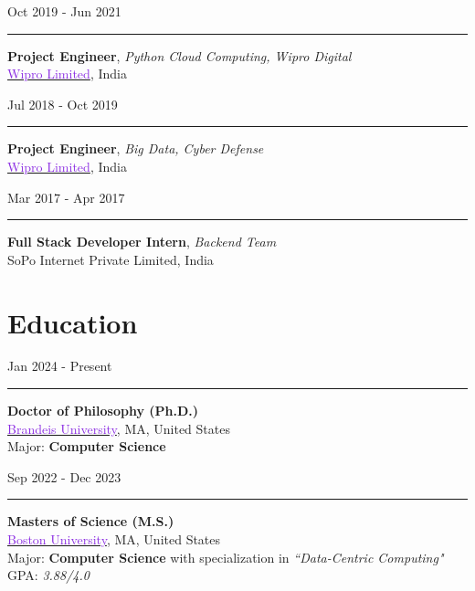 \documentclass[10pt,a4paper,calibri]{moderncv}
\newcommand{\mediumspace}{\vspace{0.6em}}
\newcommand{\education}[2]{
  \noindent
  \begin{minipage}[c]{0.20\textwidth}
    \hfill
    #1
  \end{minipage}%
  \hspace{0.01\textwidth}
  \begin{minipage}[c]{0.02\textwidth}
    \textcolor{lightgray}{\rule{1pt}{1.6cm}}
  \end{minipage}%
  \begin{minipage}[c]{0.80\textwidth}
    \raggedright{
      #2
    }
  \end{minipage}%
}
\newcommand{\workexperience}[2]{
  \noindent
  \begin{minipage}[c]{0.20\textwidth}
    \begin{flushright}
      #1
    \end{flushright}
  \end{minipage}%
  \hspace{0.01\textwidth}
  \begin{minipage}[c]{0.02\textwidth}
    \textcolor{lightgray}{\rule{1pt}{0.7cm}}
  \end{minipage}%
  \begin{minipage}[c]{0.80\textwidth}
    \raggedright{
      #2
    }
  \end{minipage}%
}
\begin{document}
\workexperience{Oct 2019 \-- Jun 2021}{
	\textbf{Project Engineer}, \textit{Python Cloud Computing, Wipro Digital}\\
	\href{https://www.wipro.com/}{\textcolor{blueviolet}{Wipro Limited}}, India\\
}

\mediumspace

\workexperience{Jul 2018 \-- Oct 2019}{
	\textbf{Project Engineer}, \textit{Big Data, Cyber Defense}\\
	\href{https://www.wipro.com/}{\textcolor{blueviolet}{Wipro Limited}}, India\\
}

\mediumspace

\workexperience{Mar 2017 \-- Apr 2017}{
	\textbf{Full Stack Developer Intern}, \textit{Backend Team}\\
	SoPo Internet Private Limited, India\\
}


\section{Education}
\noindent
\begin{minipage}[c]{0.20\textwidth}
	\hfill
	Jan 2024 \-- Present
\end{minipage}%
\hspace{0.01\textwidth}
\begin{minipage}[c]{0.02\textwidth}
	\textcolor{lightgray}{\rule{1pt}{1.2cm}}
\end{minipage}%
\begin{minipage}[c]{0.80\textwidth}
	\raggedright{
		\textbf{Doctor of Philosophy (Ph.D.)}\\
		\href{https://www.brandeis.edu/}{\textcolor{blueviolet}{Brandeis University}}, MA, United States\\
		Major: \textbf{Computer Science}\\
	}
\end{minipage}%

\mediumspace

\education{Sep 2022 \-- Dec 2023}
{
	\textbf{Masters of Science (M.S.)}\\
	\href{https://www.bu.edu/}{\textcolor{blueviolet}{Boston University}}, MA, United States\\
	Major: \textbf{Computer Science} with specialization in \textit{“Data-Centric Computing"}\\
	GPA: \textit{3.88/4.0}
}

\mediumspace
\end{document}
